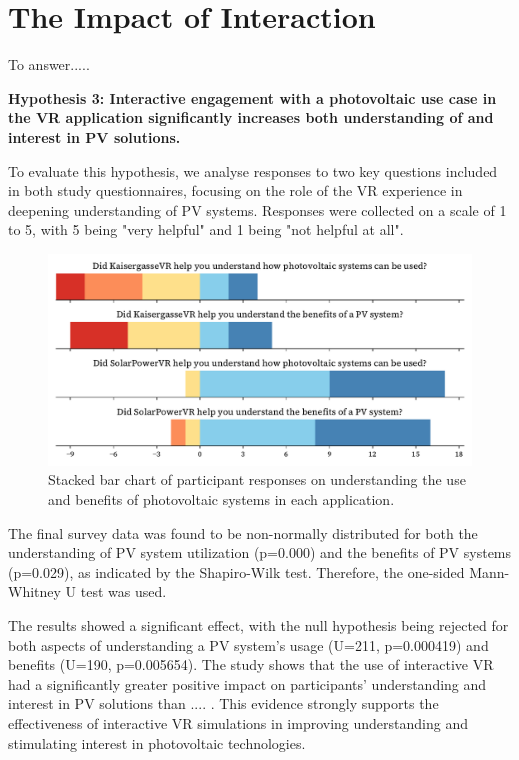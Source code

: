 \documentclass[draft, final]{vutinfth} %
\begin{document}
\section{The Impact of Interaction}

To answer.....

\textbf{Hypothesis 3: Interactive engagement with a photovoltaic use case in the VR application significantly increases both understanding of and interest in PV solutions.} 

To evaluate this hypothesis, we analyse responses to two key questions included in both study questionnaires, focusing on the role of the VR experience in deepening understanding of PV systems. Responses were collected on a scale of 1 to 5, with 5 being "very helpful" and 1 being "not helpful at all".


\begin{figure}[h]
    \centering
    \includegraphics[width=\textwidth]{graphics/research-2.pdf}
    \caption{Stacked bar chart of participant responses on understanding the use and benefits of photovoltaic systems in each application.}
    \label{fig:research-2}
\end{figure}


The final survey data was found to be non-normally distributed for both the understanding of PV system utilization (p=0.000) and the benefits of PV systems (p=0.029), as indicated by the Shapiro-Wilk test. Therefore, the one-sided Mann-Whitney U test was used.

The results showed a significant effect, with the null hypothesis being rejected for both aspects of understanding a PV system's usage (U=211, p=0.000419) and benefits (U=190, p=0.005654). The study shows that the use of interactive VR had a significantly greater positive impact on participants' understanding and interest in PV solutions than .... . This evidence strongly supports the effectiveness of interactive VR simulations in improving understanding and stimulating interest in photovoltaic technologies.
\end{document}
